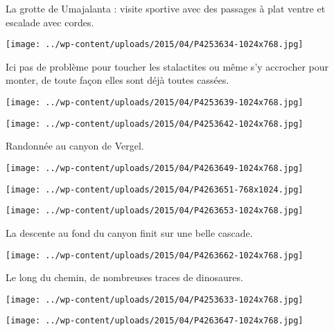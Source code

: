  La grotte de Umajalanta : visite sportive avec des passages à plat ventre et escalade avec cordes. 
\begin{center} \texttt{[image: ../wp-content/uploads/2015/04/P4253634-1024x768.jpg]} \end{center}

\pagebreak
 Ici pas de problème pour toucher les stalactites ou même s'y accrocher pour monter, de toute façon elles sont déjà toutes cassées. 
\begin{center} \texttt{[image: ../wp-content/uploads/2015/04/P4253639-1024x768.jpg]} \end{center}
\begin{center} \texttt{[image: ../wp-content/uploads/2015/04/P4253642-1024x768.jpg]} \end{center}

\pagebreak
Randonnée au canyon de Vergel. 
\begin{center} \texttt{[image: ../wp-content/uploads/2015/04/P4263649-1024x768.jpg]} \end{center}
\begin{center} \texttt{[image: ../wp-content/uploads/2015/04/P4263651-768x1024.jpg]} \end{center}
\begin{center} \texttt{[image: ../wp-content/uploads/2015/04/P4263653-1024x768.jpg]} \end{center}

 La descente au fond du canyon finit sur une belle cascade. 
\begin{center} \texttt{[image: ../wp-content/uploads/2015/04/P4263662-1024x768.jpg]} \end{center}

\pagebreak
 Le long du chemin, de nombreuses traces de dinosaures. 
\begin{center} \texttt{[image: ../wp-content/uploads/2015/04/P4253633-1024x768.jpg]} \end{center}
\begin{center} \texttt{[image: ../wp-content/uploads/2015/04/P4263647-1024x768.jpg]} \end{center}
